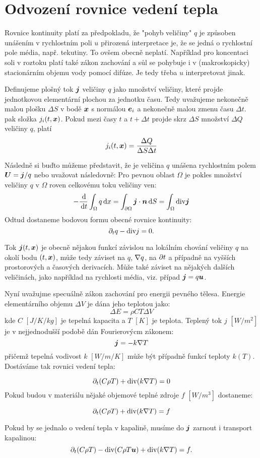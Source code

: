 \section{Odvození rovnice vedení tepla}
Rovnice kontinuity platí za předpokladu, že "pohyb veličiny" $q$ je způsoben unášením v rychlostním poli $u$ přirozená interpretace je, že se jedná o rychlostní 
pole média, např. tekutiny. To ovšem obecně neplatí. Například pro koncentaci soli v roztoku platí také zákon zachování a sůl se  
pohybuje i v (makroskopicky) stacionárním objemu vody pomocí difúze. Je tedy třeba $u$ interpretovat jinak.

Definujeme plošný tok $\mathbf{\boldsymbol{j}}$ veličiny $q$ jako množství veličiny, které projde jednotkovou elementární plochou za jednotku času. Tedy  
uvažujeme nekonečně malou plošku $\Delta S$ v bodě $\mathbf{\boldsymbol{x}}$ s normálou $\mathbf{\boldsymbol{e}}_i$ a nekonečně malou zmenu času $\Delta t$. 
pak složka $j_i(t, \mathbf{\boldsymbol{x}})$. Pokud mezi časy $t$ a $t+\Delta t$ projde skrz $\Delta S$ množství $\Delta Q$ veličiny $q$, platí
\[
    j_i(t, \mathbf{\boldsymbol{x}}) = \frac{\Delta Q}{\Delta S \Delta t} 
\]

Následně si buďto můžeme představit, že je veličina $q$ unášena rychlostním polem $\mathbf{\boldsymbol{U}} = \mathbf{\boldsymbol{j}} / q$ nebo uvažovat následovně:
Pro pevnou oblast $\Omega$ je pokles množství veličiny $q$ v $\Omega$ roven celkovému toku veličiny ven:
\[
    -\frac{\,{\rm d}}{\,{\rm d} t} \int_\Omega q \,{\rm d} x = \int_{\partial \Omega} \mathbf{\boldsymbol{j}} \cdot \mathbf{\boldsymbol{n}} \,{\rm d} S = \int_\Omega {\rm div} \mathbf{\boldsymbol{j}} 
\]
Odtud dostaneme bodovou formu obecné rovnice kontinuity:
\[
    \partial_t q - {\rm div} j = 0.
\]

Tok $\mathbf{\boldsymbol{j}}(t,\mathbf{\boldsymbol{x}})$ je obecně nějakou funkcí závislou na lokálním chování veličiny $q$ na okolí bodu $(t, \mathbf{\boldsymbol{x}})$, může tedy záviset na $q$, $\nabla q$, na $\partial t$ 
a případně na vyšších prostorových a časových derivacích. Může také záviset na nějakých dalších veličinách, jako například na rychlosti média, viz. případ $\mathbf{\boldsymbol{j}} = q\mathbf{\boldsymbol{u}}$.

Nyní uvažujme specuálně zákon zachování pro energii pevného tělesa. Energie elementárního objemu $\Delta V$ je dána jeho teplotou jako:
\[
    \Delta E = \rho CT\Delta V 
\]
kde $C$ $[J/K/kg]$ je tepelná kapacita a $T$ $[K]$ je teplota. Teplený tok $j$ $[W/m^2]$ je v nejjednodušší podobě dán Fourierovýcm zákonem:
\[
    \mathbf{\boldsymbol{j}} = -k\nabla T
\]
přičemž tepelná vodivost $k$ $[W/m/K]$ může být případně funkcí teploty $k(T)$. Dostáváme tak rovnici vedení tepla:

\[
   \partial_t (C \rho T) + {\rm div} ( k \nabla T) = 0
\]
Pokud budou v materiálu nějaké objemové teplné zdroje $f$ $[W/m^3]$ dostaneme:

\[
   \partial_t (C \rho T) + {\rm div} ( k \nabla T) = f
\]

Pokud by se jednalo o vedení tepla v kapalině, musíme do $\mathbf{\boldsymbol{j}}$ zarnout i transport kapalinou:
\[
   \partial_t (C \rho T) - {\rm div} (C \rho T \mathbf{\boldsymbol{u}}) +{\rm div}( k \nabla T) = f.
\]

